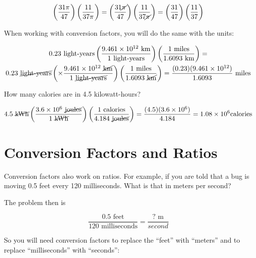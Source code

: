 $$\left( \frac{31\pi}{47} \right) \left( \frac{11}{37\pi}\right) = \left(\frac{31\cancel{\pi}}{47}\right) \left( \frac{11}{37\cancel{\pi}}\right) = \left(\frac{31}{47} \right) \left( \frac{11}{37} \right)$$

When working with conversion factors, you will do the same with the units:

\begin{multline*}
  0.23 \text{ light-years} \left( \frac{9.461 \times 10^{12} \text{ km}}{1 \text{ light-years}} \right) \left( \frac{1 \text{ miles}}{1.6093 \text{ km}} \right) = \\
  0.23 \text{ \cancel{light-years}} \left( \times \frac{9.461 \times 10^{12} \text{ \cancel{km}}}{1 \text{ \cancel{light-years}}} \right) \left( \frac{1 \text{ miles}}{1.6093 \text{ \cancel{km}}}\right) = \frac{(0.23)(9.461 \times 10^{12})}{1.6093} \text{ miles}$$
\end{multline*}

\begin{Exercise}[title={Simple Conversion Factors}, label=simple_conversion_factors]

  How many calories are in 4.5 kilowatt-hours?
  
\end{Exercise}
\begin{Answer}[ref=simple_conversion_factors]

  $$4.5 \text{ \cancel{kWh}} \left( \frac{3.6 \times 10^{6} \text{ \cancel{joules}}}{1 \text{ \cancel{kWh}}} \right) \left( \frac{1 \text{ calories}}{4.184 \text{ \cancel{joules}}}\right) = \frac{(4.5)(3.6 \times 10^6)}{4.184} = 1.08 \times 10^6 \text {calories}$$
  
\end{Answer}

\section{Conversion Factors and Ratios}

Conversion factors also work on ratios.  For example, if you are told
that a bug is moving 0.5 feet every 120 milliseconds. What is that in
meters per second?

The problem then is

$$\frac{0.5 \text{ feet}}{120 \text{ milliseconds}} = \frac{\text{? m}}{second}$$

So you will need conversion factors to replace the ``feet'' with ``meters'' and to replace ``milliseconds'' with ``seconds'':


